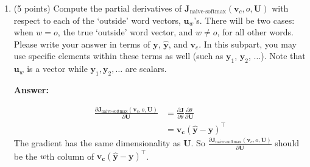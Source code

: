\documentclass{article}
\newenvironment{answer}{
        {\bf Answer:} \sf \begingroup\color{red}
    }{\endgroup}%
\begin{document}
\begin{enumerate}
        \begin{shaded}
            \begin{answer}
                $\theta = \bm{U}^{\top} \bm{v_c}\text{, where } \bm{U} \in \mathbb{R}^{|V|\times d}$
                \[
                    \begin{aligned}
                        \frac{\partial \bm J_{\text{naive-softmax}}(\bm v_c, o, \bm U)}{\partial \bm{v_c}}
                        &= \frac{\partial \bm{J}}{\partial \theta} \frac{\partial \theta}{\partial \bm{v_c}} \\
                        &= \bm{U} (\bm{\hat{y}}-\bm{y})
                    \end{aligned}
                \]
                The gradient has the same dimensionality as $\bm{v_c}$.
                It is zero when $ \hat{\bm{y}} = \bm{y} $.
                By subtracting this gradient, $\hat{\bm{v_c}}$ moves closer to the local minimum, thus becoming
                a more desirable vector.
            \end{answer}
        \end{shaded}

        \item (5 points) Compute the partial derivatives of $\bm J_{\text{naive-softmax}}(\bm v_c, o, \bm U)$ with respect to each of the `outside' word vectors, $\bm u_w$'s. There will be two cases: when $w=o$, the true `outside' word vector, and $w \neq o$, for all other words. Please write your answer in terms of $\bm y$, $\hat{\bm y}$, and $\bm v_c$. In this subpart, you may use specific elements within these terms as well (such as $\bm y_1$, $\bm y_2$, $\dots$). Note that $\bm u_w$ is a vector while $\bm y_1, \bm y_2, \dots$ are scalars.

        \begin{shaded}
            \begin{answer}
                \[
                    \begin{aligned}
                        \frac{\partial \bm J_{\text{naive-softmax}}(\bm v_c, o, \bm U)}{\partial \bm{U}}
                        &= \frac{\partial \bm{J}}{\partial \theta} \frac{\partial \theta}{\partial \bm{U}} \\
                        &= \bm{v_c} (\bm{\hat{y}}-\bm{y})^{\top}
                    \end{aligned}
                \]
                The gradient has the same dimensionality as $\bm{U}$.
                So $\frac{\partial \bm J_{\text{naive-softmax}}(\bm v_c, o, \bm U)}{\partial \bm{U}} $ should be
                the $w$th column of $\bm{v_c} (\bm{\hat{y}}-\bm{y})^{\top}$.
            \end{answer}
        \end{shaded}


\end{enumerate}
\end{document}
